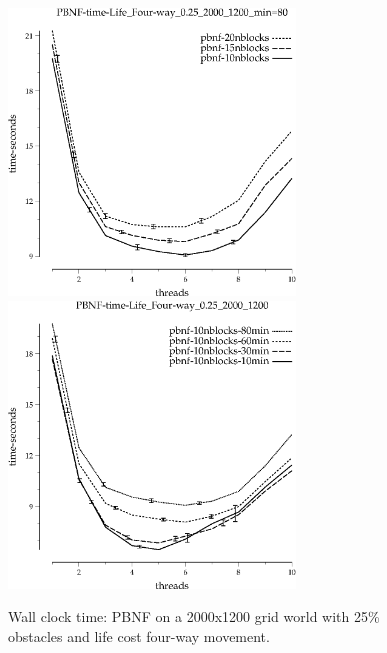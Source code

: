 \documentclass{article}
\begin{document}
\begin{figure}[t]
\begin{center}
\includegraphics[width=3in]{grid_life_four-way_0.25_2000_1200/PBNF-time-Life_Four-way_0.25_2000_1200_min=80.eps}
\includegraphics[width=3in]{grid_life_four-way_0.25_2000_1200/PBNF-time-Life_Four-way_0.25_2000_1200.eps}
\caption{Wall clock time: PBNF on a 2000x1200 grid world with 25\%
  obstacles and life cost four-way movement.}
\end{center}
\end{figure}
\end{document}
